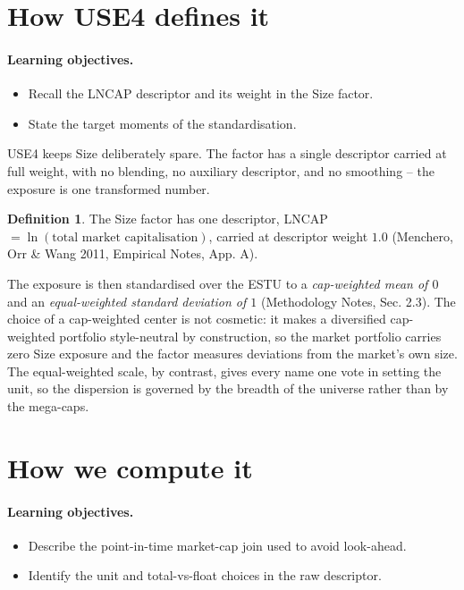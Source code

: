 \documentclass[11pt]{article}
\theoremstyle{definition}
\newtheorem{definition}{Definition}[section]
\theoremstyle{plain}
\theoremstyle{remark}
\begin{document}
\section{How USE4 defines it}\label{sec:def}

\paragraph{Learning objectives.}
\begin{itemize}[leftmargin=1.4em,topsep=2pt,itemsep=1pt]
  \item Recall the LNCAP descriptor and its weight in the Size factor.
  \item State the target moments of the standardisation.
\end{itemize}

USE4 keeps Size deliberately spare. The factor has a single descriptor carried at full weight, with no blending, no auxiliary descriptor, and no smoothing -- the exposure is one transformed number.

\begin{definition}
The Size factor has one descriptor, LNCAP $=\ln(\text{total market capitalisation})$, carried at descriptor weight $1.0$ (Menchero, Orr \& Wang 2011, Empirical Notes, App. A).
\end{definition}

The exposure is then standardised over the ESTU to a \emph{cap-weighted mean of $0$} and an \emph{equal-weighted standard deviation of $1$} (Methodology Notes, Sec. 2.3). The choice of a cap-weighted center is not cosmetic: it makes a diversified cap-weighted portfolio style-neutral by construction, so the market portfolio carries zero Size exposure and the factor measures deviations from the market's own size. The equal-weighted scale, by contrast, gives every name one vote in setting the unit, so the dispersion is governed by the breadth of the universe rather than by the mega-caps.

\section{How we compute it}\label{sec:compute}

\paragraph{Learning objectives.}
\begin{itemize}[leftmargin=1.4em,topsep=2pt,itemsep=1pt]
  \item Describe the point-in-time market-cap join used to avoid look-ahead.
  \item Identify the unit and total-vs-float choices in the raw descriptor.
\end{itemize}
\end{document}
